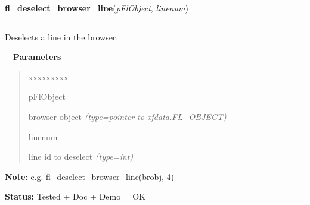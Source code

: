\hspace{.8\funcindent}\begin{boxedminipage}{\funcwidth}

    \raggedright \textbf{fl\_deselect\_browser\_line}(\textit{pFlObject}, \textit{linenum})

    \vspace{-1.5ex}

    \rule{\textwidth}{0.5\fboxrule}
\setlength{\parskip}{2ex}

Deselects a line in the browser.

-{}-
\setlength{\parskip}{1ex}
      \textbf{Parameters}
      \vspace{-1ex}

      \begin{quote}
        \begin{Ventry}{xxxxxxxxx}

          \item[pFlObject]


browser object
            {\it (type=pointer to xfdata.FL\_OBJECT)}

          \item[linenum]


line id to deselect
            {\it (type=int)}

        \end{Ventry}

      \end{quote}

\textbf{Note:} 
e.g. fl\_deselect\_browser\_line(brobj, 4)


\textbf{Status:} 
Tested + Doc + Demo = OK


    \end{boxedminipage}

    \label{xformslib:flbrowser:fl_deselect_browser}

    \vspace{0.5ex}

